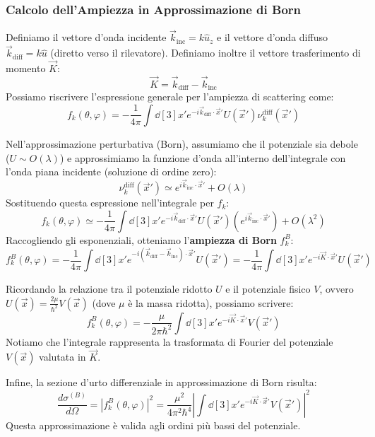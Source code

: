 \subsubsection{Calcolo dell'Ampiezza in Approssimazione di Born}

Definiamo il vettore d'onda incidente \( \vec{k}_{\text{inc}} = k \hat{u}_z \) e il vettore d'onda diffuso \( \vec{k}_{\text{diff}} = k \hat{u} \) (diretto verso il rilevatore).
Definiamo inoltre il vettore trasferimento di momento \( \vec{K} \):
\[
    \vec{K} = \vec{k}_{\text{diff}} - \vec{k}_{\text{inc}}
\]
Possiamo riscrivere l'espressione generale per l'ampiezza di scattering come:
\[
    f_k(\theta, \varphi) = -\frac{1}{4\pi} \int \dd[3]{x'} e^{-i \vec{k}_{\text{diff}} \cdot \vec{x}'} U(\vec{x}') \nu_k^{\text{diff}}(\vec{x}')
\]

Nell'approssimazione perturbativa (Born), assumiamo che il potenziale sia debole (\( U \sim O(\lambda) \)) e approssimiamo la funzione d'onda all'interno dell'integrale con l'onda piana incidente (soluzione di ordine zero):
\[
    \nu_k^{\text{diff}}(\vec{x}') \simeq e^{i \vec{k}_{\text{inc}} \cdot \vec{x}'} + O(\lambda)
\]
Sostituendo questa espressione nell'integrale per \( f_k \):
\[
    f_k(\theta, \varphi) \simeq -\frac{1}{4\pi} \int \dd[3]{x'} e^{-i \vec{k}_{\text{diff}} \cdot \vec{x}'} U(\vec{x}') \left( e^{i \vec{k}_{\text{inc}} \cdot \vec{x}'} \right) + O(\lambda^2)
\]
Raccogliendo gli esponenziali, otteniamo l'\textbf{ampiezza di Born} \( f_k^B \):
\begin{equation}
    f_k^B(\theta, \varphi) = -\frac{1}{4\pi} \int \dd[3]{x'} e^{-i (\vec{k}_{\text{diff}} - \vec{k}_{\text{inc}}) \cdot \vec{x}'} U(\vec{x}') = -\frac{1}{4\pi} \int \dd[3]{x'} e^{-i \vec{K} \cdot \vec{x}'} U(\vec{x}')
\end{equation}

Ricordando la relazione tra il potenziale ridotto \( U \) e il potenziale fisico \( V \), ovvero \( U(\vec{x}) = \frac{2\mu}{\hbar^2} V(\vec{x}) \) (dove \( \mu \) è la massa ridotta), possiamo scrivere:
\[
    f_k^B(\theta, \varphi) = -\frac{\mu}{2\pi\hbar^2} \int \dd[3]{x'} e^{-i \vec{K} \cdot \vec{x}'} V(\vec{x}')
\]
Notiamo che l'integrale rappresenta la trasformata di Fourier del potenziale \( V(\vec{x}) \) valutata in \( \vec{K} \).

Infine, la sezione d'urto differenziale in approssimazione di Born risulta:
\begin{equation}
    \frac{d\sigma^{(B)}}{d\Omega} = |f_k^B(\theta, \varphi)|^2 = \frac{\mu^2}{4\pi^2\hbar^4} \left| \int \dd[3]{x'} e^{-i \vec{K} \cdot \vec{x}'} V(\vec{x}') \right|^2
\end{equation}
Questa approssimazione è valida agli ordini più bassi del potenziale.

